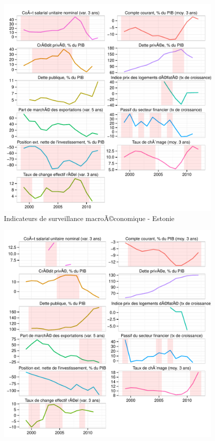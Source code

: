 \documentclass{article}\usepackage[]{graphicx}\usepackage[]{color}
\makeatletter
\def\maxwidth{ %
  \ifdim\Gin@nat@width>\linewidth
    \linewidth
  \else
    \Gin@nat@width
  \fi
}
\newenvironment{knitrout}{}{} %
\makeatother
\begin{document}
\begin{knitrout}
\begin{figure}[p]
{\centering \includegraphics[width=\maxwidth]{figure_graph/byco8} 

}

\caption[Indicateurs de surveillance macroÃ©conomique - Estonie]{Indicateurs de surveillance macroÃ©conomique - Estonie\label{fig:byco8}}
\end{figure}

\begin{figure}[p]


{\centering \includegraphics[width=\maxwidth]{figure_graph/byco9} 

}
\end{figure}
\end{knitrout}
\end{document}
